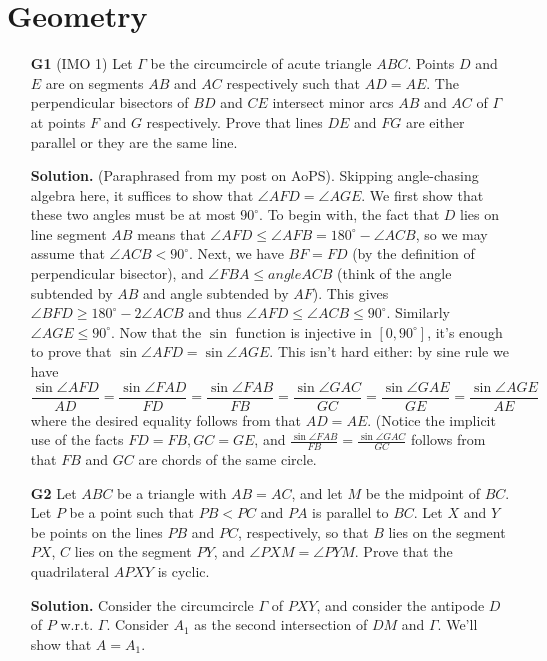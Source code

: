 \documentclass[11pt,a4paper]{article}
\begin{document}
\section*{Geometry}
\begin{enumerate}
	\item[\textbf{G1}] (IMO 1) Let $\Gamma$ be the circumcircle of acute triangle $ABC$. Points $D$ and $E$ are on segments $AB$ and $AC$ respectively such that $AD = AE$. The perpendicular bisectors of $BD$ and $CE$ intersect minor arcs $AB$ and $AC$ of $\Gamma$ at points $F$ and $G$ respectively. Prove that lines $DE$ and $FG$ are either parallel or they are the same line.
	
	\textbf{Solution.} 
	(Paraphrased from my post on AoPS). 
	Skipping angle-chasing algebra here, it suffices to show that $\angle AFD=\angle AGE$. We first show that these two angles must be at most $90^{\circ}$. To begin with, the fact that $D$ lies on line segment $AB$ means that $\angle AFD\le \angle AFB=180^{\circ}-\angle ACB$, so we may assume that $\angle ACB<90^{\circ}$. Next, we have $BF=FD$ (by the definition of perpendicular bisector), and $\angle FBA\le angle ACB$ (think of the angle subtended by $AB$ and angle subtended by $AF$). This gives $\angle BFD\ge 180^{\circ}-2\angle ACB$ and thus $\angle AFD\le \angle ACB\le 90^{\circ}$. Similarly $\angle AGE\le 90^{\circ}$. Now that the $\sin$ function is injective in $[0, 90^{\circ}]$, it's enough to prove that $\sin\angle AFD=\sin\angle AGE$. This isn't hard either: by sine rule we have
	\[\frac{\sin\angle AFD}{AD}=\frac{\sin\angle FAD}{FD}=\frac{\sin\angle FAB}{FB}=\frac{\sin\angle GAC}{GC}=\frac{\sin\angle GAE}{GE}=\frac{\sin\angle AGE}{AE}\]where the desired equality follows from that $AD=AE$. (Notice the implicit use of the facts $FD=FB, GC=GE$, and $\frac{\sin\angle FAB}{FB}=\frac{\sin\angle GAC}{GC}$ follows from that $FB$ and $GC$ are chords of the same circle. 
	
	\item [\textbf{G2}] Let $ABC$ be a triangle with $AB=AC$, and let $M$ be the midpoint of $BC$. Let $P$ be a point such that $PB<PC$ and $PA$ is parallel to $BC$. Let $X$ and $Y$ be points on the lines $PB$ and $PC$, respectively, so that $B$ lies on the segment $PX$, $C$ lies on the segment $PY$, and $\angle PXM=\angle PYM$. Prove that the quadrilateral $APXY$ is cyclic.
	
	\textbf{Solution.} Consider the circumcircle $\Gamma$ of $PXY$, and consider the antipode $D$ of $P$ w.r.t. $\Gamma$. Consider $A_1$ as the second intersection of $DM$ and $\Gamma$. We'll show that $A=A_1$. 
	

\end{enumerate}
\end{document}
